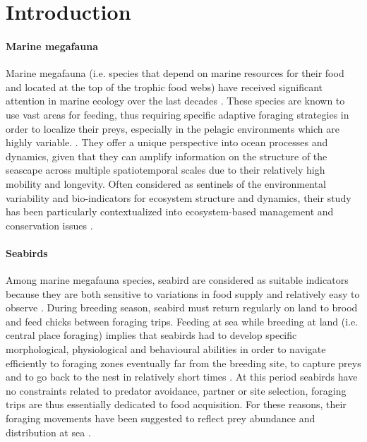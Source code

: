 \documentclass{article}
\begin{document}

\newpage


\section{Introduction}
\paragraph{Marine megafauna}
Marine megafauna (i.e. species that depend on marine resources for their food and located at the top of the trophic food webs) have received significant attention in marine ecology over the last decades \citep{authier_conservation_2017}.
These species are known to use vast areas for feeding, thus requiring specific adaptive foraging strategies in order to localize their preys, especially in the pelagic environments which are highly variable. \citep{hazen_marine_2019}.
They offer a unique perspective into ocean processes and dynamics, given that they can  amplify  information on the structure of the seascape across  multiple spatiotemporal scales due to their relatively high mobility and longevity.
Often considered as sentinels of the environmental variability and bio-indicators for ecosystem structure and dynamics, their study has been particularly contextualized into ecosystem-based management and conservation issues \citep{lascelles_migratory_2014, hays_key_2016, hooker_marine_2004}.

\paragraph{Seabirds}
Among marine megafauna species, seabird are considered as suitable indicators because they are both sensitive to variations in food supply and relatively easy to observe \citep{furness_seabirds_1997, wakefield_quantifying_2009}.
During breeding season, seabird must return regularly on land to brood and feed chicks between foraging trips.
Feeding at sea while breeding at land (i.e. central place foraging) implies  that seabirds had to develop specific morphological, physiological and behavioural abilities in order to navigate efficiently to foraging zones eventually far from the breeding site, to capture preys and to go back to the nest in relatively short times \citep{schreiber_biology_2001}.
At this period seabirds have no constraints related to predator avoidance, partner or site selection, foraging trips are thus essentially dedicated to food acquisition. For these reasons, their foraging movements have been suggested to reflect prey abundance and distribution at sea \citep{weimerskirch_are_2007}.
\end{document}
